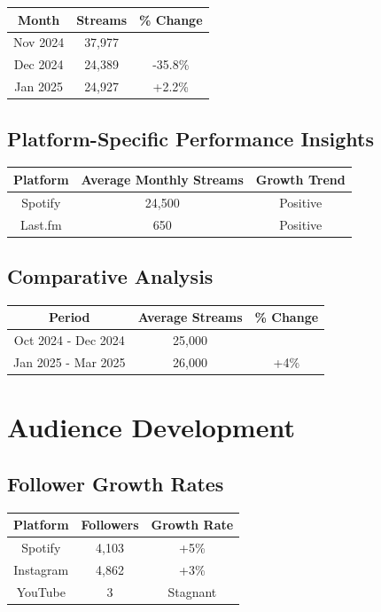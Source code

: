 \documentclass{report}
\begin{document}
\begin{tabular}{|c|c|c|}
    \hline
    \textbf{Month} & \textbf{Streams} & \textbf{\% Change} \\
    \hline
    Nov 2024 & 37,977 & \\
    Dec 2024 & 24,389 & -35.8\% \\
    Jan 2025 & 24,927 & +2.2\% \\
    \hline
\end{tabular}

\subsection{Platform-Specific Performance Insights}

\begin{tabular}{|c|c|c|}
    \hline
    \textbf{Platform} & \textbf{Average Monthly Streams} & \textbf{Growth Trend} \\
    \hline
    Spotify & 24,500 & Positive \\
    Last.fm & 650 & Positive \\
    \hline
\end{tabular}

\subsection{Comparative Analysis}

\begin{tabular}{|c|c|c|}
    \hline
    \textbf{Period} & \textbf{Average Streams} & \textbf{\% Change} \\
    \hline
    Oct 2024 - Dec 2024 & 25,000 & \\
    Jan 2025 - Mar 2025 & 26,000 & +4\% \\
    \hline
\end{tabular}

\newpage

\section{Audience Development}

\subsection{Follower Growth Rates}

\begin{tabular}{|c|c|c|}
    \hline
    \textbf{Platform} & \textbf{Followers} & \textbf{Growth Rate} \\
    \hline
    Spotify & 4,103 & +5\% \\
    Instagram & 4,862 & +3\% \\
    YouTube & 3 & Stagnant \\
    \hline
\end{tabular}
\end{document}
